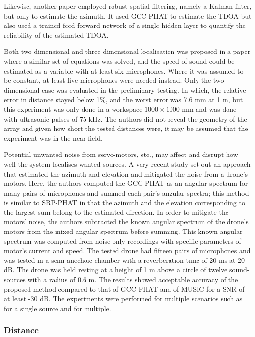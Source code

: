 \documentclass{report}
\begin{document}
Likewise, another paper \cite{kim_robust_2008} employed robust spatial filtering, namely a Kalman filter, but only to estimate the azimuth. It used GCC-PHAT to estimate the TDOA but also used a trained feed-forward network of a single hidden layer to quantify the reliability of the estimated TDOA. 

Both two-dimensional and three-dimensional localisation was proposed in a paper \cite{mahajan_3d_2001} where a similar set of equations was solved, and the speed of sound could be estimated as a variable with at least six microphones. Where it was assumed to be constant, at least five microphones were needed instead. Only the two-dimensional case was evaluated in the preliminary testing. In which, the relative error in distance stayed below 1\%, and the worst error was 7.6 \si{mm} at 1 \si{m}, but this experiment was only done in a workspace $1000\times 1000$ \si{mm} and was done with ultrasonic pulses of 75 \si{kHz}. The authors did not reveal the geometry of the array and given how short the tested distances were, it may be assumed that the experiment was in the near field.

Potential unwanted noise from servo-motors, etc., may affect and disrupt how well the system localises wanted sources. A very recent study \cite{manamperi_drone_2022} set out an approach that estimated the azimuth and elevation and mitigated the noise from a drone's motors. Here, the authors computed the GCC-PHAT as an angular spectrum for many pairs of microphones and summed each pair's angular spectra; this method is similar to SRP-PHAT in that the azimuth and the elevation corresponding to the largest sum belong to the estimated direction. In order to mitigate the motors' noise, the authors subtracted the known angular spectrum of the drone's motors from the mixed angular spectrum before summing. This known angular spectrum was computed from noise-only recordings with specific parameters of motor's current and speed. The tested drone had fifteen pairs of microphones and was tested in a semi-anechoic chamber with a reverberation-time of 20 \si{ms} at 20 \si{dB}. The drone was held resting at a height of 1 \si{m} above a circle of twelve sound-sources with a radius of 0.6 \si{m}. The results showed acceptable accuracy of the proposed method compared to that of GCC-PHAT and of MUSIC for a SNR of at least -30 \si{dB}. The experiments were performed for multiple scenarios such as for a single source and for multiple.

\subsubsection{Distance}
\end{document}
